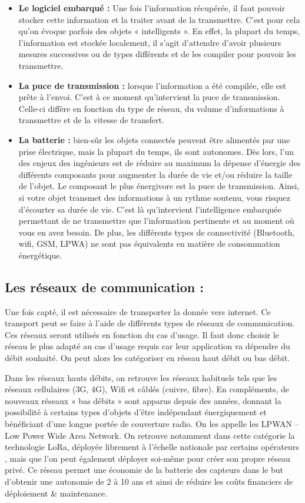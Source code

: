 \begin{itemize}[label=\textbullet]
\item \textbf{Le logiciel embarqué :} Une fois l’information récupérée, il faut pouvoir stocker cette information et la traiter avant de la transmettre. C’est pour cela qu’on évoque parfois des objets « intelligents ». En effet, la plupart du temps, l’information est stockée localement, il s’agit d’attendre d’avoir plusieurs mesures successives ou de types différents et de les compiler pour pouvoir les transmettre.
\item \textbf{La puce de transmission :} lorsque l’information a été compilée, elle est prête à l’envoi. C’est à ce moment qu’intervient la puce de transmission. Celle-ci diffère en fonction du type de réseau, du volume d’informations à transmettre et de la vitesse de transfert.
\item \textbf{La batterie :} bien-sûr les objets connectés peuvent être alimentés par une prise électrique, mais la plupart du temps, ils sont autonomes. Dès lors, l’un des enjeux des ingénieurs est de réduire au maximum la dépense d’énergie des différents composants pour augmenter la durée de vie et/ou réduire la taille de l’objet. Le composant le plus énergivore est la puce de transmission. Ainsi, si votre objet transmet des informations à un rythme soutenu, vous risquez d’écourter sa durée de vie. C’est là qu’intervient l’intelligence embarquée permettant de ne transmettre que l’information pertinente et au moment où vous en avez besoin. De plus, les différents types de connectivité (Bluetooth, wifi, GSM, LPWA) ne sont pas équivalents en matière de consommation énergétique.
\end{itemize}

\subsection{Les réseaux de communication :}
Une fois capté, il est nécessaire de transporter la donnée vers internet. Ce transport peut se faire à l’aide de différents types de réseaux de communication. Ces réseaux seront utilisés en fonction du cas d’usage. Il faut donc choisir le réseau le plus adapté au cas d’usage requis car leur application va dépendre du débit souhaité. On peut alors les catégoriser en réseau haut débit ou bas débit.

Dans les réseaux hauts débits, on retrouve les réseaux habituels tels que les réseaux cellulaires (3G, 4G), Wifi et câblés (cuivre, fibre). En compléments, de nouveaux réseaux « bas débits » sont apparus depuis des années, donnant la possibilité à certains types d’objets d’être indépendant énergiquement et bénéficiant d’une longue portée de couverture radio. On les appelle les LPWAN – Low Power Wide Area Network. On retrouve notamment dans cette catégorie la technologie LoRa, déployée librement à l’échelle nationale par certains opérateurs , mais que l’on peut également déployer soi-même pour créer son propre réseau privé. Ce réseau permet une économie de la batterie des capteurs dans le but d’obtenir une autonomie de 2 à 10 ans et ainsi de réduire les coûts financiers de déploiement \& maintenance.

